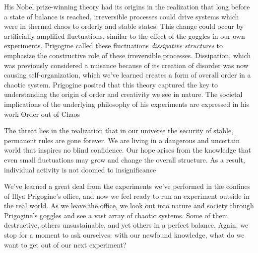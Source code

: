 \documentclass{article}
\begin{document}
His Nobel prize-winning theory had its origins in the realization that long before a state of balance is reached, irreversible processes could drive systems which were in thermal chaos to orderly and stable states\cite{ds}. This change could occur by artificially amplified fluctuations, similar to the effect of the goggles in our own experiments. Prigogine called these fluctuations \emph{dissipative structures} to emphasize the constructive role of these irreversible processes. Dissipation, which was previously considered a nuisance because of its creation of disorder was now causing self-organization, which we've learned creates a form of overall order in a chaotic system. Prigogine posited that this theory captured the key to understanding the origin of order and creativity we see in nature. The societal implications of the underlying philosophy of his experiments are expressed in his work Order out of Chaos\cite{oooc}
\begin{displayquote}
The threat lies in the realization that in our universe the security of stable, permanent rules are gone forever. We are living in a dangerous and uncertain world that inspires no blind confidence. Our hope arises from the knowledge that even small fluctuations may grow and change the overall structure. As a result, individual activity is not doomed to insignificance
\end{displayquote}

We've learned a great deal from the experiments we've performed in the confines of Illya Prigogine's office, and now we feel ready to run an experiment outside in the real world. As we leave the office, we look out into nature and society through Prigogine's goggles and see a vast array of chaotic systems. Some of them destructive, others unsustainable, and yet others in a perfect balance. Again, we stop for a moment to ask ourselves: with our newfound knowledge, what do we want to get out of our next experiment?
\end{document}
